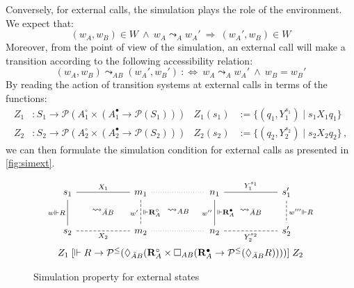 \documentclass[acmsmall,screen,review,anonymous]{acmart}
\newcommand{\que}{\circ}
\newcommand{\ans}{\bullet}
\begin{document}
Conversely, for external calls,
the simulation plays the role of the environment.
We expect that:
\[
  (w_A, w_B) \in W \:\wedge\:
  w_A \leadsto_A w_A' \:\Rightarrow\:
  (w_A', w_B) \in W
\]
Moreover,
from the point of view of the simulation,
an external call will make a transition according to
the following accessibility relation:
\[
  (w_A, w_B) \leadsto_{AB} (w_A', w_B') \::\Leftrightarrow\:
  w_A \leadsto_A w_A' \:\wedge\:
  w_B = w_B'
\]
By reading the action of transition systems at external calls
in terms of the functions:
\begin{align*}
  Z_1 &: S_1 \rightarrow
    \mathcal{P}(A_1^\que \times (A_1^\ans \rightarrow \mathcal{P}(S_1))) &
  Z_1(s_1) &:= \{ (q_1, Y_1^{s_1}) \mid s_1 \mathrel{X_1} q_1 \}
 \\
  Z_2 &: S_2 \rightarrow
    \mathcal{P}(A_2^\que \times (A_2^\ans \rightarrow \mathcal{P}(S_2))) &
  Z_2(s_2) &:= \{ (q_2, Y_2^{s_2}) \mid s_2 \mathrel{X_2} q_2 \}
  \,,
\end{align*}
we can then formulate the simulation condition for external calls
as presented in \autoref{fig:simext}.

\begin{figure} %
  \[
    \begin{array}{c}
      \begin{tikzcd}[sep=tiny, column sep=small]
        s_1 \ar[rr, "X_1", dash] \ar[dd, "w \Vdash R"', dash] &&
        m_1 \ar[rr, dotted, dash] \ar[dd, "w'"', "{} \Vdash \mathbf{R}_A^\que", dash, dashed] &&
        n_1 \ar[rr, "Y_1^{s_1}", dash] \ar[dd, "w''"', "{} \Vdash \mathbf{R}_A^\ans", dash] &&
        s_1' \ar[dd, "w''' \Vdash R", dash, dashed]
        \\
        & \leadsto_{\bar{A}B} && \leadsto_{AB} && \leadsto_{\bar{A}B} &
        \\
        s_2 \ar[rr, "X_2"', dash, dashed] &&
        m_2 \ar[rr, dotted, dash] &&
        n_2 \ar[rr, "Y_2^{s_2}"', dash, dashed] &&
        s_2'
      \end{tikzcd}
      \vspace{1ex} \\
      Z_1
      \mathrel{[
        \Vdash R \rightarrow \mathcal{P}^\le(
          \Diamond_{\bar{A}B} (
          \mathbf{R}_A^\que \times
            \Box_{AB} (
            \mathbf{R}_A^\ans \rightarrow
            \mathcal{P}^\le(\Diamond_{\bar{A}B} R))))
      ]}
      Z_2
    \end{array}
  \]
  \caption{Simulation property for external states}
  \label{fig:simext}
\end{figure}
\end{document}
